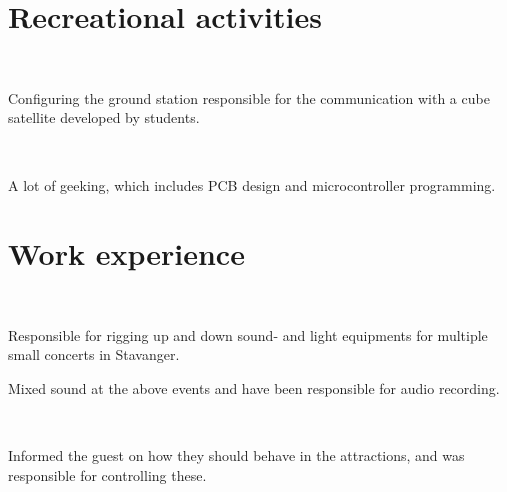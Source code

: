 \documentclass[]{resume-build}
\begin{document}
\begin{minipage}[t]{0.65\textwidth} 

\section{Recreational activities}

\\
\sectionsep
\begin{tightemize}
    \item Configuring the ground station responsible for the communication with a cube satellite developed by students.
\end{tightemize}

\\
\begin{tightemize}
    \item A lot of geeking, which includes PCB design and microcontroller programming.
\end{tightemize}

\sectionsep


\section{Work experience}

\\
\begin{tightemize}
\item Responsible for rigging up and down sound- and light equipments for multiple small concerts in Stavanger.
\item Mixed sound at the above events and have been responsible for audio recording.
\end{tightemize}
\sectionsep

 \\
\begin{tightemize}
\item Informed the guest on how they should behave in the attractions, and was responsible for controlling these.
\end{tightemize}
\sectionsep


\end{minipage}
\end{document}
